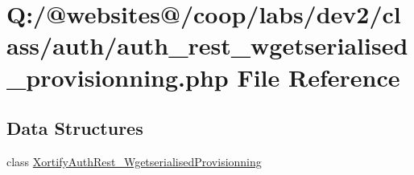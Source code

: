\hypertarget{auth__rest__wgetserialised__provisionning_8php}{\section{Q\-:/@websites@/coop/labs/dev2/class/auth/auth\-\_\-rest\-\_\-wgetserialised\-\_\-provisionning.php File Reference}
\label{auth__rest__wgetserialised__provisionning_8php}
}
\subsection*{Data Structures}
\begin{DoxyCompactItemize}
\item 
class \hyperlink{class_xortify_auth_rest___wgetserialised_provisionning}{Xortify\-Auth\-Rest\-\_\-\-Wgetserialised\-Provisionning}
\end{DoxyCompactItemize}

